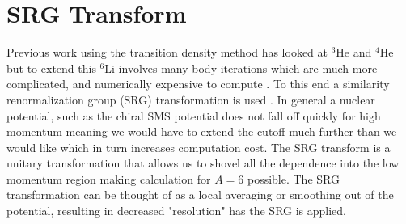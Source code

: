 \documentclass[a4paper,11pt]{article}
\newcommand{\LiS}{{}^{6} \mathrm{Li} }
\newcommand{\HeF}{{}^{4} \mathrm{He}}
\newcommand{\HeT}{{}^{3} \mathrm{He}}
\begin{document}
\section{SRG Transform}
Previous work using the transition density method has looked at $\HeT$ and $\HeF$ but to extend this $\LiS$ involves many body iterations which are much more complicated, and numerically expensive to compute \cite{hammer2020, hammer4He}. 
To this end a similarity renormalization group (SRG) transformation is used \cite{SRG}.
In general a nuclear potential, such as the chiral SMS potential does not fall off quickly for high momentum meaning we would have to extend the cutoff much further than we would like which in turn increases computation cost.
The SRG transform is a unitary transformation that allows us to shovel all the dependence into the low momentum region making calculation for $A=6$ possible.
The SRG transformation can be thought of as a local averaging or smoothing out of the potential, resulting in decreased "resolution" has the SRG is applied.
\end{document}
